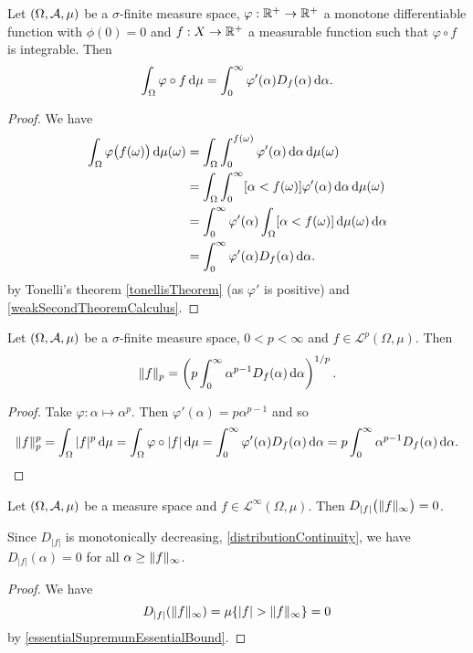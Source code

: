 \begin{proposition}
Let $\sSet{\Omega, \mathcal{A}, \mu}$ be a $\sigma$-finite measure space, $\varphi: \mathbb{R}^+\to \mathbb{R}^+$ a monotone differentiable function with $\phi(0) = 0$ and $f: X\to \mathbb{R}^+$ a measurable function such that $\varphi\circ f$ is integrable. Then
\[ \int_\Omega\varphi\circ f \operatorname{d \!}{\mu} = \int_0^\infty \varphi'(\alpha)D_f(\alpha)\operatorname{d \!}{\alpha}. \]
\end{proposition}
\begin{proof}
We have
\begin{align*}
\int_\Omega\varphi\big(f(\omega)\big) \diff{\mu(\omega)} &= \int_\Omega\int_{0}^{f(\omega)}\varphi'(\alpha)\diff{\alpha} \diff{\mu(\omega)} \\
&= \int_\Omega\int_{0}^{\infty}[\alpha < f(\omega)]\varphi'(\alpha)\diff{\alpha} \diff{\mu(\omega)} \\
&= \int_{0}^{\infty}\varphi'(\alpha)\int_\Omega[\alpha < f(\omega)]\diff{\mu(\omega)}\diff{\alpha} \\
&= \int_{0}^{\infty}\varphi'(\alpha)D_f(\alpha)\diff{\alpha}.
\end{align*}
by Tonelli's theorem \ref{tonellisTheorem} (as $\varphi'$ is positive) and \ref{weakSecondTheoremCalculus}.
\end{proof}
\begin{corollary} \label{LpNormFromDistribution}
Let $\sSet{\Omega, \mathcal{A}, \mu}$ be a $\sigma$-finite measure space, $0<p<\infty$ and $f\in \mathcal{L}^p(\Omega,\mu)$. Then
\[ \lVert f\rVert_p = \left(p\int_0^\infty \alpha^{p-1}D_f(\alpha)\operatorname{d \!}{\alpha}\right)^{1/p}. \]
\end{corollary}
\begin{proof}
Take $\varphi: \alpha\mapsto \alpha^p$. Then $\varphi'(\alpha) = p\alpha^{p-1}$ and so
\[ \lVert f\rVert_p^p = \int_\Omega |f|^p \operatorname{d \!}{\mu} = \int_\Omega \varphi\circ|f| \operatorname{d \!}{\mu} = \int_0^\infty \varphi'(\alpha)D_f(\alpha)\operatorname{d \!}{\alpha} = p\int_0^\infty \alpha^{p-1}D_f(\alpha)\operatorname{d \!}{\alpha}. \]
\end{proof}

\begin{lemma} \label{distributionPastEssentialSupremumIsZero}
Let $\sSet{\Omega, \mathcal{A}, \mu}$ be a measure space and $f\in \mathcal{L}^\infty(\Omega, \mu)$. Then $D_{|f|}\big(\lVert f\rVert_\infty\big) = 0$.
\end{lemma}
Since $D_{|f|}$ is monotonically decreasing, \ref{distributionContinuity}, we have $D_{|f|}(\alpha) = 0$ for all $\alpha \geq \lVert f\rVert_\infty$.
\begin{proof}
We have
\[ D_{|f|}(\lVert f\rVert_\infty) = \mu\{|f| > \lVert f\rVert_\infty\} = 0  \]
by \ref{essentialSupremumEssentialBound}.
\end{proof}

